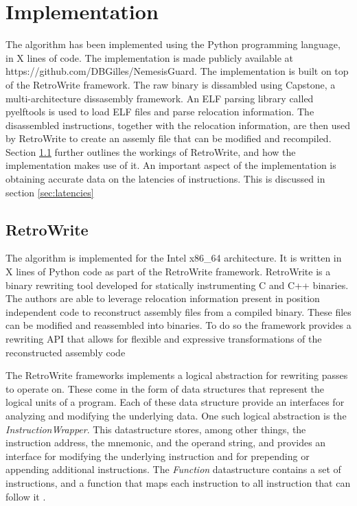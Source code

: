 \chapter{Implementation}
\label{cha:implementation}
The algorithm has been implemented using the Python programming language, in X lines of code. 
The implementation is made publicly available at https://github.com/DBGilles/NemesisGuard. 
The implementation is built on top of the RetroWrite framework. 
The raw binary is dissambled using Capstone, a multi-architecture dissasembly framework. An ELF parsing library called pyelftools is used to load ELF files and parse relocation information. 
The disassembled instructions, together with the relocation information, are then used by RetroWrite to create an assemly file that can be modified and recompiled. 
Section \ref{sec:retrowrite} further outlines the workings of RetroWrite, and how the implementation makes use of it. 
An important aspect of the implementation is obtaining accurate data on the latencies of instructions. 
This is discussed in section  \ref{sec:latencies}


\section{RetroWrite}
\label{sec:retrowrite}
The algorithm is implemented for the Intel x86\_64 architecture. It is written in X lines of Python code as part of the RetroWrite framework. 
RetroWrite is a binary rewriting tool developed for statically instrumenting C and C++ binaries. 
The authors are able to leverage relocation information present in position independent code to reconstruct assembly files from a compiled binary. 
These files can be modified and reassembled into binaries. 
To do so the framework provides a rewriting API that allows for flexible and expressive transformations of the reconstructed assembly code \cite{Dinesh2020RetroWriteSI}

The RetroWrite frameworks implements a logical abstraction for rewriting passes to operate on.
These come in the form of data structures that represent the logical units of a program.
Each of these data structure provide an interfaces for analyzing and modifying the underlying data. 
One such logical abstraction is the \textit{InstructionWrapper}. 
This datastructure stores, among other things, the instruction address, the mnemonic, and the operand string, and provides an interface
for modifying the underlying instruction and for prepending or appending additional instructions.  
The \textit{Function} datastructure contains a set of instructions, and a function that maps each instruction to all instruction that can follow it \cite{Dinesh2020RetroWriteSI, hexhive}. 

